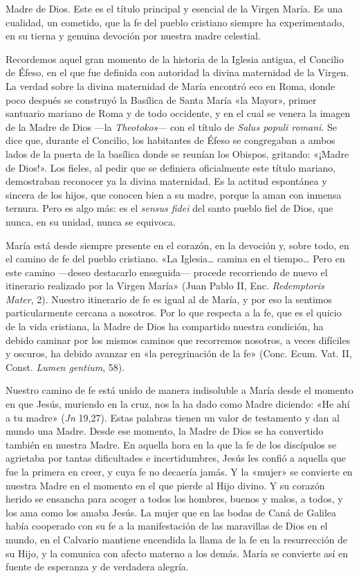 \documentclass[]{article}
\begin{document}
Madre de Dios. Este es el título principal y esencial de la Virgen
María. Es una cualidad, un cometido, que la fe del pueblo cristiano
siempre ha experimentado, en su tierna y genuina devoción por nuestra
madre celestial.

Recordemos aquel gran momento de la historia de la Iglesia antigua, el
Concilio de Éfeso, en el que fue definida con autoridad la divina
maternidad de la Virgen. La verdad sobre la divina maternidad de María
encontró eco en Roma, donde poco después se construyó la Basílica de
Santa María «la Mayor», primer santuario mariano de Roma y de todo
occidente, y en el cual se venera la imagen de la Madre de Dios ---la
\emph{Theotokos}--- con el título de \emph{Salus populi romani}. Se dice
que, durante el Concilio, los habitantes de Éfeso se congregaban a ambos
lados de la puerta de la basílica donde se reunían los Obispos,
gritando: «¡Madre de Dios!». Los fieles, al pedir que se definiera
oficialmente este título mariano, demostraban reconocer ya la divina
maternidad. Es la actitud espontánea y sincera de los hijos, que conocen
bien a su madre, porque la aman con inmensa ternura. Pero es algo más:
es el \emph{sensus fidei} del santo pueblo fiel de Dios, que nunca, en
su unidad, nunca se equivoca.

María está desde siempre presente en el corazón, en la devoción y, sobre
todo, en el camino de fe del pueblo cristiano. «La Iglesia\ldots{}
camina en el tiempo\ldots{} Pero en este camino ---deseo destacarlo
enseguida--- procede recorriendo de nuevo el itinerario realizado por la
Virgen María» (Juan Pablo II, Enc. \emph{Redemptoris Mater}, 2). Nuestro
itinerario de fe es igual al de María, y por eso la sentimos
particularmente cercana a nosotros. Por lo que respecta a la fe, que es
el quicio de la vida cristiana, la Madre de Dios ha compartido nuestra
condición, ha debido caminar por los mismos caminos que recorremos
nosotros, a veces difíciles y oscuros, ha debido avanzar en «la
peregrinación de la fe» (Conc. Ecum. Vat. II, Const. \emph{Lumen
gentium}, 58).

Nuestro camino de fe está unido de manera indisoluble a María desde el
momento en que Jesús, muriendo en la cruz, nos la ha dado como Madre
diciendo: «He ahí a tu madre» (\emph{Jn} 19,27). Estas palabras tienen
un valor de testamento y dan al mundo una Madre. Desde ese momento, la
Madre de Dios se ha convertido también en nuestra Madre. En aquella hora
en la que la fe de los discípulos se agrietaba por tantas dificultades e
incertidumbres, Jesús les confió a aquella que fue la primera en creer,
y cuya fe no decaería jamás. Y la «mujer» se convierte en nuestra Madre
en el momento en el que pierde al Hijo divino. Y su corazón herido se
ensancha para acoger a todos los hombres, buenos y malos, a todos, y los
ama como los amaba Jesús. La mujer que en las bodas de Caná de Galilea
había cooperado con su fe a la manifestación de las maravillas de Dios
en el mundo, en el Calvario mantiene encendida la llama de la fe en la
resurrección de su Hijo, y la comunica con afecto materno a los demás.
María se convierte así en fuente de esperanza y de verdadera alegría.
\end{document}
